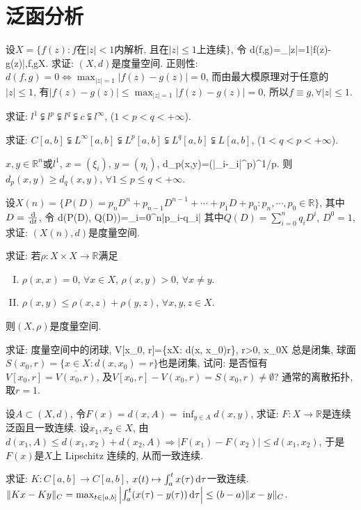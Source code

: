 \chapter{泛函分析}
\bq{}{}
设$X=\{f(z): f\textrm{在}|z|<1\textrm{内解析, 且在}|z|\le1\textrm{上连续}\}$, 令
\bee
d(f,g)=\max_{|z|=1}|f(z)-g(z)|,\quad f,g\in X.
\eee
求证: $(X, d)$是度量空间.
\eq
\ba
正则性: $d(f,g)=0\Longleftrightarrow\max_{|z|=1}|f(z)-g(z)|=0$, 而由最大模原理对于任意的$|z|\le 1$, 有$|f(z)-g(z)|\le\max_{|z|=1}|f(z)-g(z)|=0$, 
所以$f\equiv g, \forall |z|\le 1$.
\ea

\bq{}{}
求证: $l^1\subsetneqq l^p\subsetneqq l^q\subsetneqq c\subsetneqq l^{\infty}$, ($1<p<q<+\infty$).
\eq

\bq{}{}
求证: $C[a,b]\subsetneqq L^{\infty}[a,b]\subsetneqq L^p[a,b]\subsetneqq L^q[a,b]\subsetneqq L[a,b]$, ($1<q<p<+\infty$).
\eq

\bq{}{}
$x,y\in\mathbb{R}^n$或$l^1$, $x=(\xi_i)$, $y=(\eta_i)$, 
\bee
d_p(x,y)=\left(\sum|\xi_i-\eta_i|^p\right)^{1/p}.
\eee
则$d_p(x,y)\ge d_q(x,y)$, $\forall 1\le p\le q<+\infty$.
\eq

\bq{}{}
设$X(n)=\{P(D)=p_nD^n+p_{n-1}D^{n-1}+\cdots+p_1D+p_0: p_n,\cdots, p_0\in\mathbb{R}\}$, 其中$D=\frac{\,\mathrm{d}}{\,\mathrm{d} t}$, 令
\bee
d(P(D), Q(D))=\sum_{i=0}^{n}|p_i-q_i|
\eee
其中$Q(D)=\sum_{i=0}^{n}q_iD^i$, $D^0=1$, 求证: $(X(n), d)$是度量空间.
\eq

\bq{}{}
求证: 若$\rho: X\times X\to \mathbb{R}$满足
\begin{enumerate}[(I)]
 \item $\rho(x,x)=0$, $\forall x\in X$, $\rho(x,y)>0$, $\forall x\ne y$.
 \item $\rho(x,y)\le\rho(x,z)+\rho(y,z)$, $\forall x,y,z\in X$.
\end{enumerate}
则$(X, \rho)$是度量空间.
\eq

\bq{}{}
求证: 度量空间中的闭球,
\bee
V[x_0, r]=\{x\in X: d(x, x_0)\le r\}, r>0, x_0\in X
\eee
总是闭集, 球面$S(x_0, r)=\{x\in X: d(x, x_0)=r\}$也是闭集, 试问: 是否恒有$V[x_0, r]=\overline{V(x_0, r)}$, 
及$V[x_0, r]-V(x_0, r)=S(x_0, r)\ne\emptyset$?
\eq
\ba
通常的离散拓扑, 取$r=1$.
\ea

\bq{}{}
设$A\subset(X, d)$, 令$F(x)=d(x, A)=\inf_{y\in A}d(x,y)$, 求证: $F: X\to\mathbb{R}$是连续泛函且一致连续.
\eq
\ba
设$x_1, x_2\in X$, 由$d(x_1, A)\le d(x_1, x_2)+d(x_2, A)\Longrightarrow |F(x_1)-F(x_2)|\le d(x_1, x_2)$, 
于是$F(x)$是$X$上 Lipschitz 连续的, 从而一致连续.
\ea

\bq{}{}
求证: $K: C[a,b]\to C[a,b]$, $x(t)\mapsto\int_{a}^{t}x(\tau)\,\mathrm{d} \tau$一致连续.
\eq
\ba
$\|Kx-Ky\|_C=\max_{t\in[a,b]}\left|\int_{a}^{t}(x(\tau)-y(\tau))\,\mathrm{d} \tau\right|\le(b-a)\|x-y\|_C$.
\ea


